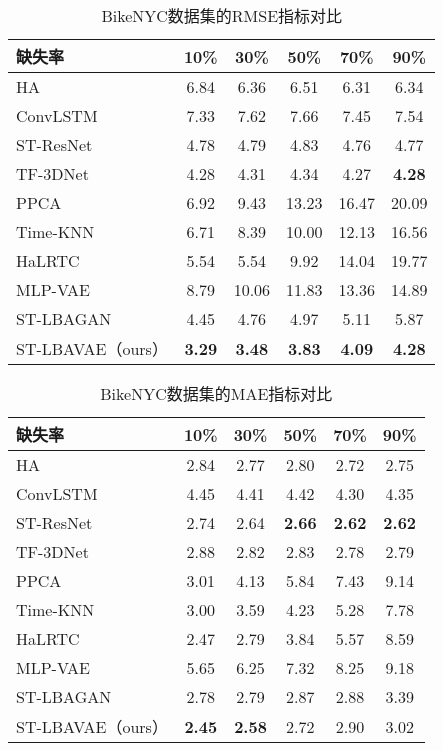 \begin{table}[htbp] 
\caption{BikeNYC数据集的RMSE指标对比} \label{rmse_bikenyc}
\vspace{0.5em}\centering\wuhao
\begin{tabular*}{\hsize}{@{}@{\extracolsep{\fill}}lccccc@{}}
\toprule[1.5pt]
缺失率 & 10\% & 30\% & 50\% & 70\% & 90\%\\
\midrule[1pt]
HA        & 6.84 & 6.36  & 6.51  & 6.31  & 6.34 \\
ConvLSTM  & 7.33 & 7.62  & 7.66  & 7.45  & 7.54 \\
ST-ResNet & 4.78 & 4.79  & 4.83  & 4.76  & 4.77 \\
TF-3DNet  & 4.28 & 4.31  & 4.34  & 4.27  & \textbf{4.28} \\
PPCA      & 6.92 & 9.43  & 13.23 & 16.47 & 20.09 \\
Time-KNN  & 6.71 & 8.39  & 10.00 & 12.13 & 16.56 \\
HaLRTC    & 5.54 & 5.54  & 9.92  & 14.04 & 19.77 \\
MLP-VAE   & 8.79 & 10.06 & 11.83 & 13.36 & 14.89 \\
ST-LBAGAN & 4.45 & 4.76  & 4.97  & 5.11  & 5.87 \\
ST-LBAVAE（ours） & \textbf{3.29} & \textbf{3.48} & \textbf{3.83} & \textbf{4.09} & \textbf{4.28}  \\
\bottomrule[1.5pt]
\end{tabular*}
\end{table}

\begin{table}[htbp] 
\caption{BikeNYC数据集的MAE指标对比} \label{mae_bikenyc}
\vspace{0.5em}\centering\wuhao
\begin{tabular*}{\hsize}{@{}@{\extracolsep{\fill}}lccccc@{}}
\toprule[1.5pt]
缺失率 & 10\% & 30\% & 50\% & 70\% & 90\%\\
\midrule[1pt]
HA        & 2.84 & 2.77  & 2.80  & 2.72  & 2.75 \\
ConvLSTM  & 4.45 & 4.41  & 4.42  & 4.30  & 4.35 \\
ST-ResNet & 2.74 & 2.64  & \textbf{2.66}  & \textbf{2.62}  & \textbf{2.62} \\
TF-3DNet  & 2.88 & 2.82  & 2.83  & 2.78  & 2.79 \\
PPCA      & 3.01 & 4.13  & 5.84  & 7.43  & 9.14 \\
Time-KNN  & 3.00 & 3.59  & 4.23  & 5.28  & 7.78 \\
HaLRTC    & 2.47 & 2.79  & 3.84  & 5.57  & 8.59 \\
MLP-VAE   & 5.65 & 6.25  & 7.32  & 8.25  & 9.18 \\
ST-LBAGAN & 2.78 & 2.79  & 2.87  & 2.88  & 3.39 \\
ST-LBAVAE（ours） & \textbf{2.45} & \textbf{2.58} & 2.72 & 2.90 & 3.02  \\
\bottomrule[1.5pt]
\end{tabular*}
\end{table}

